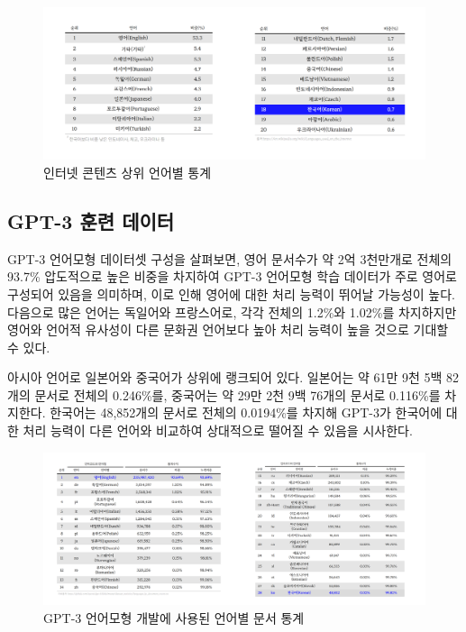 \documentclass[
  letterpaper,
]{book}
\begin{document}
\begin{figure}

{\centering \includegraphics{images/llm_contents_gt.jpg}

}

\caption{인터넷 콘텐츠 상위 언어별 통계}

\end{figure}

\hypertarget{gpt-3-uxd6c8uxb828-uxb370uxc774uxd130}{%
\subsection{GPT-3 훈련
데이터}\label{gpt-3-uxd6c8uxb828-uxb370uxc774uxd130}}

GPT-3 언어모형 데이터셋 구성을 살펴보면, 영어 문서수가 약 2억 3천만개로
전체의 93.7\% 압도적으로 높은 비중을 차지하여 GPT-3 언어모형 학습
데이터가 주로 영어로 구성되어 있음을 의미하며, 이로 인해 영어에 대한
처리 능력이 뛰어날 가능성이 높다. 다음으로 많은 언어는 독일어와
프랑스어로, 각각 전체의 1.2\%와 1.02\%를 차지하지만 영어와 언어적
유사성이 다른 문화권 언어보다 높아 처리 능력이 높을 것으로 기대할 수
있다.

아시아 언어로 일본어와 중국어가 상위에 랭크되어 있다. 일본어는 약 61만
9천 5백 82개의 문서로 전체의 0.246\%를, 중국어는 약 29만 2천 9백 76개의
문서로 0.116\%를 차지한다. 한국어는 48,852개의 문서로 전체의 0.0194\%를
차지해 GPT-3가 한국어에 대한 처리 능력이 다른 언어와 비교하여 상대적으로
떨어질 수 있음을 시사한다.

\begin{figure}

{\centering \includegraphics{images/llm_gpt_gt.jpg}

}

\caption{GPT-3 언어모형 개발에 사용된 언어별 문서 통계}

\end{figure}
\end{document}
